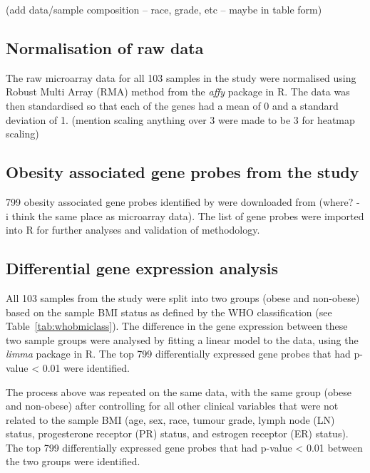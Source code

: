 (add data/sample composition -- race, grade, etc -- maybe in table form)

\subsection{Normalisation of raw \citet{Creighton2012} data}
\label{subsec:normcrdata}

The raw microarray data for all 103 samples in the study were normalised using Robust Multi Array (RMA) method from the \textit{affy} package in R.
The data was then standardised so that each of the genes had a mean of 0 and a standard deviation of 1.
(mention scaling anything over 3 were made to be 3 for heatmap scaling)

\subsection{Obesity associated gene probes from the \citet{Creighton2012} study}
\label{subsec:crobsgene}

799 obesity associated gene probes identified by \citet{Creighton2012} were downloaded from (where? - i think the same place as microarray data).
The list of gene probes were imported into R for further analyses and validation of methodology.

\subsection{Differential gene expression analysis}
\label{subsec:deg}

All 103 samples from the \citet{Creighton2012} study were split into two groups (obese and non-obese) based on the sample BMI status as defined by the WHO classification (see Table~\ref{tab:whobmiclass}).
The difference in the gene expression between these two sample groups were analysed by fitting a linear model to the data, using the \textit{limma} package in R.
The top 799 differentially expressed gene probes that had p-value \textless{} 0.01 were identified.

The process above was repeated on the same data, with the same group (obese and non-obese) after controlling for all other clinical variables that were not related to the sample BMI (age, sex, race, tumour grade, lymph node (LN) status, progesterone receptor (PR) status, and estrogen receptor (ER) status).
The top 799 differentially expressed gene probes that had p-value \textless{} 0.01 between the two groups were identified.

